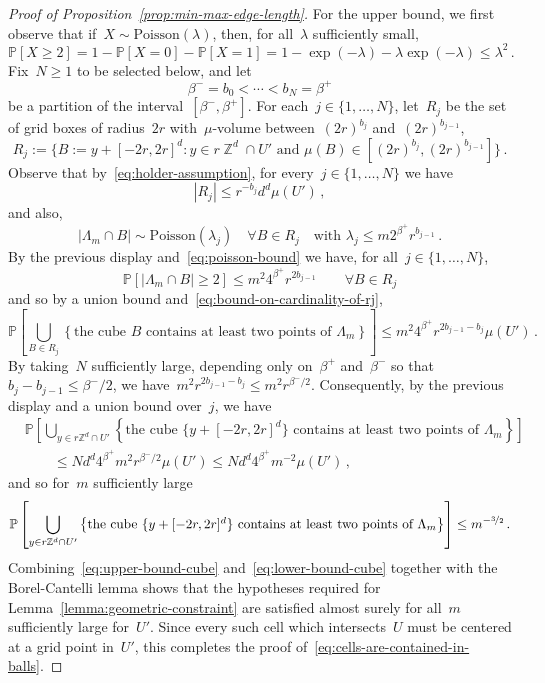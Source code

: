 \documentclass[12pt]{amsart}
\numberwithin{equation}{section}
\DeclareMathOperator{\Z}{\mathbb{Z}}
\renewcommand*{\P}{\mathbb P}
\newcommand*{\Zd}{\ensuremath{\mathbb{Z}^d}}
\begin{document}
\begin{proof}[Proof of Proposition~\ref{prop:min-max-edge-length}]
	For the upper bound, we first observe that if~$X \sim \mbox{Poisson}(\lambda)$, then, for all~$\lambda$ sufficiently small,
	\begin{equation}
		\label{eq:poisson-bound}
	\P[X \geq 2] = 1 - \P[X=0]  - \P[X=1]  = 1 - \exp(-\lambda) - \lambda \exp(-\lambda) \leq \lambda^2 \, . 
	\end{equation}
	Fix~$N \geq 1$ to be selected below, and let
	\[
	\beta^- = b_0 < \cdots < b_N = \beta^+
	\]
	be a partition of the interval~$[\beta^-, \beta^+]$. For each~$j \in \{1, \ldots, N\}$, let~$R_j$
	be the set of grid boxes of radius~$2 r$ with~$\mu$-volume between~$(2r)^{b_{j}}$ and~$(2r)^{b_{j-1}}$, 
	\[
	R_j := \{ B := y + [-2 r, 2 r]^d  : y \in r \Z^d \cap U' \, \, \mbox{and} \, \, \mu(B) \in [(2 r)^{b_{j}}, (2 r)^{b_{j-1}}]  \} \, . 
	\]
	Observe that by~\eqref{eq:holder-assumption}, for every~$j \in \{1, \ldots, N\}$ we have 
	\begin{equation}
		\label{eq:bound-on-cardinality-of-rj}
		|R_j| \leq r^{-b_{j}} d^d \mu(U') \, ,
	\end{equation}
	and also, 
	\begin{equation*}
		|\Lambda_m \cap B| \sim \mbox{Poisson}(\lambda_j) \quad \forall B \in R_j \quad \mbox{with~$\lambda_j \leq m 2^{\beta^+} r^{b_{j-1}}$} \, .
	\end{equation*}
	 By the previous display and~\eqref{eq:poisson-bound} we have, for all~$j \in \{1, \ldots, N\}$, 
	\[
	\P[	|\Lambda_m \cap B| \geq 2] \leq m^2 4^{\beta^+} r^{2 b_{j-1}} \qquad \forall B \in R_j 
	\]
	and so by a union bound and~\eqref{eq:bound-on-cardinality-of-rj}, 
	\[
		\P\left[ \bigcup_{B \in R_j} \left\{\mbox{the cube~$B$ contains at least two points of~$\Lambda_m$}\right\} \right] \leq  m^2 4^{\beta^+} r^{2 b_{j-1} - b_{j}} \mu(U') \, . 
	\]
	By taking~$N$ sufficiently large, depending only on~$\beta^{+}$ and~$\beta^-$ so that~$b_{j} - b_{j-1} \leq \beta^-/2$, we have~$m^2 r^{2 b_{j-1} - b_j} \leq m^2 r^{\beta^-/2}$. Consequently, by the previous display and a union bound over~$j$, we have 
	\begin{align*}
		&\P\left[ \bigcup_{y \in r \Zd \cap U'} \left\{\mbox{the cube~$\{y +[-2 r, 2r]^d\}$ contains at least two points of~$\Lambda_m$} \right\} \right] \\
		&\qquad \leq  N d^d 4^{\beta^+} m^2 r^{\beta^-/2} \mu(U') \leq N d^d 4^{\beta^+} m^{-2} \mu(U') \, ,
	\end{align*}
	and so for~$m$ sufficiently large
	\begin{equation}
	\label{eq:upper-bound-cube}
			\P\left[ \bigcup_{y \in r \Zd \cap U'} \left\{\mbox{the cube~$\{y +[-2 r,2 r]^d\}$ contains at least two points of~$\Lambda_m$} \right\} \right]  \leq m^{-\nicefrac32}  \, . 
	\end{equation}
	Combining~\eqref{eq:upper-bound-cube} and~\eqref{eq:lower-bound-cube} together with the Borel-Cantelli lemma
	shows that the hypotheses required for Lemma~\ref{lemma:geometric-constraint} are satisfied almost surely 
	for all~$m$ sufficiently large for~$U'$. Since every such cell which intersects~$U$ must be centered at a grid point in~$U'$,  this completes the proof of~\eqref{eq:cells-are-contained-in-balls}.
	

\end{proof}
\end{document}
